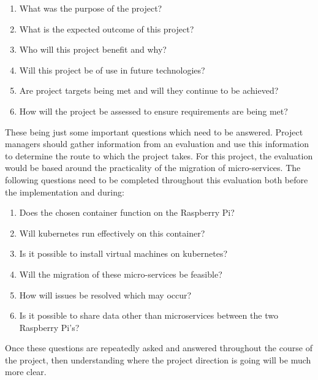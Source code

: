 \begin{enumerate}
    \item What was the purpose of the project?
    \item What is the expected outcome of this project?
    \item Who will this project benefit and why?
    \item Will this project be of use in future technologies?
    \item Are project targets being met and will they continue to be achieved?
    \item How will the project be assessed to ensure requirements are being met? 
\end{enumerate}

These being just some important questions which need to be answered. Project managers should gather information from an evaluation and use this information to determine the route to which the project takes. For this project, the evaluation would be based around the practicality of the migration of micro-services. The following questions need to be completed throughout this evaluation both before the implementation and during:

\begin{enumerate}
    \item Does the chosen container function on the Raspberry Pi?
    \item Will kubernetes run effectively on this container?
    \item Is it possible to install virtual machines on kubernetes?
    \item Will the migration of these micro-services be feasible?
    \item How will issues be resolved which may occur?
    \item Is it possible to share data other than microservices between the two Raspberry Pi's?
\end{enumerate}

Once these questions are repeatedly asked and answered throughout the course of the project, then understanding where the project direction is going will be much more clear. 

